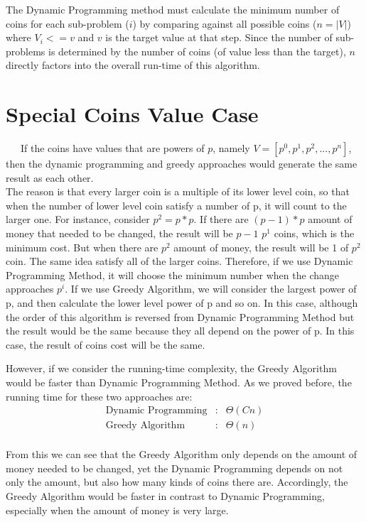 \documentclass[11pt]{scrreprt}
\begin{document}
The Dynamic Programming method must calculate the minimum number of coins for each sub-problem ($i$) by comparing against all possible coins ($n = |V|$) where $V_i <= v$ and $v$ is the target value at that step. Since the number of sub-problems is determined by the number of coins (of value less than the target), $n$ directly factors into the overall run-time of this algorithm.

\section{Special Coins Value Case}

\ \ \ If the coins have values that are powers of $p$, namely $V = [p^0 , p^1 , p^2 , ... , p^n]$, then the dynamic programming and greedy approaches would generate the same result as each other.\\

The reason is that every larger coin is a multiple of its lower level coin, so that when the number of lower level coin satisfy a number of p, it will count to the larger one. For instance, consider $p^2 = p*p$. If there are $(p-1)*p$ amount of money that needed to be changed, the result will be $p-1$ $p^1$ coins, which is the minimum cost. But when there are $p^2$ amount of money, the result will be 1 of $p^2$ coin. The same idea satisfy all of the larger coins. Therefore, if we use Dynamic Programming Method, it will choose the minimum number when the change approaches $p^i$. If we use Greedy Algorithm, we will consider the largest power of p, and then calculate the lower level power of p and so on. In this case, although the order of this algorithm is reversed from Dynamic Programming Method but the result would be the same because they all depend on the power of p. In this case, the result of coins cost will be the same.

However, if we consider the running-time complexity, the Greedy Algorithm would be faster than Dynamic Programming Method. As we proved before, the running time for these two approaches are:
\begin{eqnarray*}
\mbox{Dynamic Programming}&:& \Theta(Cn)\\
\mbox{Greedy Algorithm}&:& \Theta(n)\\
\end{eqnarray*}

From this we can see that the Greedy Algorithm only depends on the amount of money needed to be changed, yet the Dynamic Programming depends on not only the amount, but also how many kinds of coins there are. Accordingly, the Greedy Algorithm would be faster in contrast to Dynamic Programming, especially when the amount of money is very large.
\end{document}
